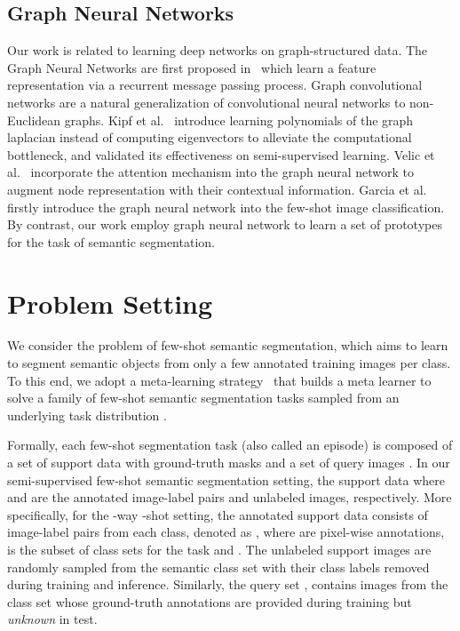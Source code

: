 \documentclass[runningheads]{llncs}
\begin{document}
\subsection{Graph Neural Networks}
Our work is related to learning deep networks on graph-structured data. The Graph Neural Networks are first proposed in~\cite{gori2005new,scarselli2008graph} which learn a feature representation via a recurrent message passing process. Graph convolutional networks are a natural generalization of convolutional neural networks to non-Euclidean graphs. Kipf et al.~\cite{kipf2016semi} introduce learning polynomials of the graph laplacian instead of computing eigenvectors to alleviate the computational bottleneck, 
and validated its effectiveness on semi-supervised learning. 
Velic et al.~\cite{velivckovic2017graph} incorporate the attention mechanism into the graph neural network to augment node representation with their contextual information.
Garcia et al.~\cite{garcia2017few} firstly introduce the graph neural network into the few-shot image classification. By contrast, our work employ graph neural network to learn a set of prototypes for the task of semantic segmentation.


\section{Problem Setting}\label{setting}
We consider the problem of few-shot semantic segmentation, which aims to learn to segment semantic objects from only a few annotated training images per class.  
To this end, we adopt a meta-learning strategy~\cite{vinyals2016matching,boots2017one} that builds a meta learner   to solve a family of few-shot semantic segmentation tasks  sampled from an underlying task distribution .      

Formally, each few-shot segmentation task  (also called an episode) is composed of a set of support data  with ground-truth masks and a set of query images . 
In our semi-supervised few-shot semantic segmentation setting, the support data  where  and   are the annotated image-label pairs and unlabeled images, respectively. More specifically, for the -way -shot setting, the annotated support data consists of  image-label pairs from each class, denoted as , where  are pixel-wise annotations,  is the subset of class sets for the task  and . The unlabeled support images  are randomly sampled from the semantic class set  with their class labels removed during training and inference.
Similarly, the query set , contains  images from the class set  whose ground-truth annotations  are provided during training but \textit{unknown} in test.
\end{document}
